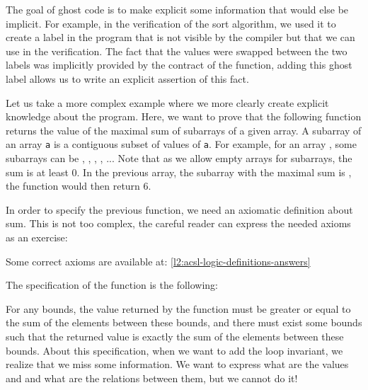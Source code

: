 

The goal of ghost code is to make explicit some information that would else
be implicit. For example, in the verification of the sort algorithm, we used it
to create a label in the program that is not visible by the compiler but that
we can use in the verification. The fact that the values were swapped between the
two labels was implicitly provided by the contract of the function, adding this
ghost label allows us to write an explicit assertion of this fact.



Let us take a more complex example where we more clearly create explicit
knowledge about the program. Here, we want to prove that the
following function returns the value of the maximal sum of subarrays of
a given array. A subarray of an array \texttt{a} is a contiguous subset
of values of \texttt{a}. For example, for an array ,
some subarrays can be
\CodeInline{\{\}}, , 
, , ... Note that as we allow
empty arrays for subarrays, the sum is at least 0. In the previous
array, the subarray with the maximal sum is ,
the function would then return 6.






In order to specify the previous function, we need an axiomatic
definition about sum. This is not too complex, the careful reader
can express the needed axioms as an exercise:






Some correct axioms are available at: \ref{l2:acsl-logic-definitions-answers}



The specification of the function is the following:






For any bounds, the value returned by the function must be greater or
equal to the sum of the elements between these bounds, and there must
exist some bounds such that the returned value is exactly the sum of the
elements between these bounds. About this specification, when we want to
add the loop invariant, we realize that we miss some information.
We want to express what are the values  and  and
what are the relations between them, but we cannot do it!


